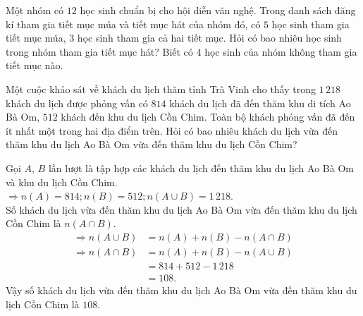 \begin{bt}%
Một nhóm có $12$ học sinh chuẩn bị cho hội diễn văn nghệ. Trong danh sách đăng kí tham gia tiết mục múa và tiết mục hát của nhóm đó, có $5$ học sinh tham gia tiết mục múa, $3$ học sinh tham gia cả hai tiết mục. Hỏi có bao nhiêu học sinh trong nhóm tham gia tiết mục hát? Biết có $4$ học sinh của nhóm không tham gia tiết mục nào.

\end{bt}

\begin{bt}%
	Một cuộc khảo sát về khách du lịch thăm tỉnh Trà Vinh cho thấy trong $1\,218$ khách du lịch được phỏng vấn có $814$ khách du lịch đã đến thăm khu di tích Ao Bà Om, $512$ khách đến khu du lịch Cồn Chim. Toàn bộ khách phỏng vấn đã đến ít nhất một trong hai địa điểm trên. Hỏi có bao nhiêu khách du lịch vừa đến thăm khu du lịch Ao Bà Om vừa đến thăm khu du lịch Cồn Chim?
	
	\loigiai
	{
		Gọi $A$, $B$ lần lượt là tập hợp các khách du lịch đến thăm khu du lịch Ao Bà Om và khu du lịch Cồn Chim.\\
		$\Rightarrow n(A) = 814; n(B) = 512; n(A \cup B) = 1\,218$.\\
		Số khách du lịch vừa đến thăm khu du lịch Ao Bà Om vừa đến thăm khu du lịch Cồn Chim là $n(A \cap B)$.
		\begin{align*}
			\Rightarrow n(A \cup B) &= n(A) + n(B) - n(A \cap B)\\
			\Rightarrow n(A \cap B) &= n(A) + n(B) - n(A \cup B)\\
			&= 814+512-1\,218\\
			&= 108.
		\end{align*}
		Vậy số khách du lịch vừa đến thăm khu du lịch Ao Bà Om vừa đến thăm khu du lịch Cồn Chim là $108$.
	}
\end{bt}

